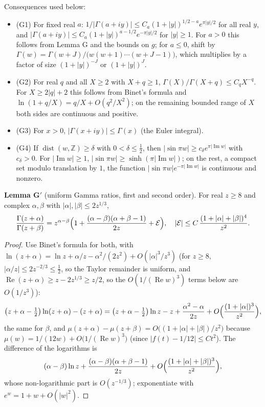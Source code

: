 \documentclass[11pt]{article}
\newcommand{\re}{\operatorname{Re}}
\newcommand{\im}{\operatorname{Im}}
\newcommand{\dist}{\operatorname{dist}}
\begin{document}
Consequences used below:
\begin{itemize}
\item (G1) For fixed real $a$: $1/|\Gamma(a+iy)|\le C_a(1+|y|)^{1/2-a}e^{\pi|y|/2}$ for all real $y$, and $|\Gamma(a+iy)|\le C_a(1+|y|)^{a-1/2}e^{-\pi|y|/2}$ for $|y|\ge1$. For $a>0$ this follows from Lemma G and the bounds on $g$; for $a\le0$, shift by $\Gamma(w)=\Gamma(w+J)/\bigl(w(w+1)\cdots(w+J-1)\bigr)$, which multiplies by a factor of size $(1+|y|)^{-J}$ or $(1+|y|)^{J}$.
\item (G2) For real $q$ and all $X\ge2$ with $X+q\ge1$, $\Gamma(X)/\Gamma(X+q)\le C_qX^{-q}$. For $X\ge2|q|+2$ this follows from Binet's formula and $\ln(1+q/X)=q/X+O(q^2/X^2)$; on the remaining bounded range of $X$ both sides are continuous and positive.
\item (G3) For $x>0$, $|\Gamma(x+iy)|\le\Gamma(x)$ (the Euler integral).
\item (G4) If $\dist(w,\mathbb{Z})\ge\delta$ with $0<\delta\le\frac12$, then $|\sin\pi w|\ge c_\delta e^{\pi|\im w|}$ with $c_\delta>0$. For $|\im w|\ge1$, $|\sin\pi w|\ge\sinh(\pi|\im w|)$; on the rest, a compact set modulo translation by $1$, the function $|\sin\pi w|e^{-\pi|\im w|}$ is continuous and nonzero.
\end{itemize}

\medskip
\noindent\textbf{Lemma G$'$} (uniform Gamma ratios, first and second order). For real $z\ge8$ and complex $\alpha,\beta$ with $|\alpha|,|\beta|\le2z^{1/3}$,
\[
\frac{\Gamma(z+\alpha)}{\Gamma(z+\beta)}=z^{\alpha-\beta}\Bigl(1+\frac{(\alpha-\beta)(\alpha+\beta-1)}{2z}+\mathcal{E}\Bigr),\quad|\mathcal{E}|\le C\,\frac{(1+|\alpha|+|\beta|)^4}{z^2}.
\]

\begin{proof}
Use Binet's formula for both, with $\ln(z+\alpha)=\ln z+\alpha/z-\alpha^2/(2z^2)+O(|\alpha|^3/z^3)$ (for $z\ge8$, $|\alpha/z|\le2z^{-2/3}\le\frac12$, so the Taylor remainder is uniform, and $\re(z+\alpha)\ge z-2z^{1/3}\ge z/2$, so the $O(1/(\re w)^3)$ terms below are $O(1/z^3)$):
\[
\bigl(z+\alpha-\tfrac12\bigr)\ln(z+\alpha)-(z+\alpha)=\bigl(z+\alpha-\tfrac12\bigr)\ln z-z+\frac{\alpha^2-\alpha}{2z}+O\Bigl(\frac{(1+|\alpha|)^3}{z^2}\Bigr),
\]
the same for $\beta$, and $\mu(z+\alpha)-\mu(z+\beta)=O\bigl((1+|\alpha|+|\beta|)/z^2\bigr)$ because $\mu(w)=1/(12w)+O\bigl(1/(\re w)^3\bigr)$ (since $|f(t)-1/12|\le Ct^2$). The difference of the logarithms is
\[
(\alpha-\beta)\ln z+\frac{(\alpha-\beta)(\alpha+\beta-1)}{2z}+O\Bigl(\frac{(1+|\alpha|+|\beta|)^3}{z^2}\Bigr),
\]
whose non-logarithmic part is $O(z^{-1/3})$; exponentiate with $e^w=1+w+O(|w|^2)$.
\end{proof}
\end{document}

